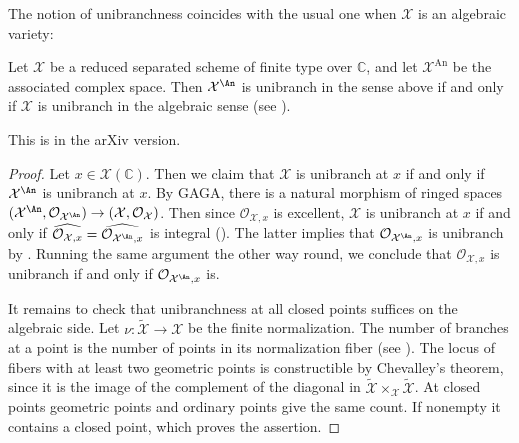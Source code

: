 The notion of unibranchness coincides with the usual one when $\mathcal{X}$ is an algebraic variety:
\begin{proposition}\label{prop:unibranch_gaga}
    Let $\mathcal{X}$ be a reduced separated scheme of finite type over $\mathbb{C}$, and let $\mathcal{X}^{\mathrm{An}}$ be the associated complex space.
    Then $\mathcal{X}^{\An}$ is unibranch in the sense above if and only if $\mathcal{X}$ is unibranch in the algebraic sense (see \cite[\href{https://stacks.math.columbia.edu/tag/0BQ2}{Tag 0BQ2}]{stacks-project}).
\end{proposition}
This is \cite[Remark~2.7]{Xia23Mabuchi} in the arXiv version.
\begin{proof}
    Let $x\in \mathcal{X}(\mathbb{C})$. Then we claim that $\mathcal{X}$ is unibranch at $x$ if and only if $\mathcal{X}^{\An}$ is unibranch at $x$. By GAGA, there is a natural morphism of ringed spaces $(\mathcal{X}^{\An},\mathcal{O}_{\mathcal{X}^{\An}})\rightarrow (\mathcal{X},\mathcal{O}_{\mathcal{X}})$.
	 Then since $\mathcal{O}_{\mathcal{X},x}$ is excellent, $\mathcal{X}$ is unibranch at $x$ if and only if $\widehat{\mathcal{O}_{\mathcal{X},x}}=\widehat{\mathcal{O}_{\mathcal{X}^{\An},x}}$ is integral (\cite[Théorème~18.9.1]{EGAIV4}). The latter implies that $\mathcal{O}_{\mathcal{X}^{\An},x}$ is unibranch by \cite[Chapitre~5, Exercise~2.8]{AC}. Running the same argument the other way round, we conclude that $\mathcal{O}_{\mathcal{X},x}$ is unibranch if and only if $\mathcal{O}_{\mathcal{X}^{\An},x}$ is.

    It remains to check that unibranchness at all closed points suffices on the algebraic side. Let $\nu\colon \widetilde{\mathcal{X}}\to\mathcal{X}$ be the finite normalization. The number of branches at a point is the number of points in its normalization fiber (see \cite[\href{https://stacks.math.columbia.edu/tag/0C3Z}{Section 0C3Z}]{stacks-project}). The locus of fibers with at least two geometric points is constructible by Chevalley's theorem, since it is the image of the complement of the diagonal in $\widetilde{\mathcal{X}}\times_{\mathcal{X}}\widetilde{\mathcal{X}}$. At closed points geometric points and ordinary points give the same count. If nonempty it contains a closed point, which proves the assertion.
\end{proof}

